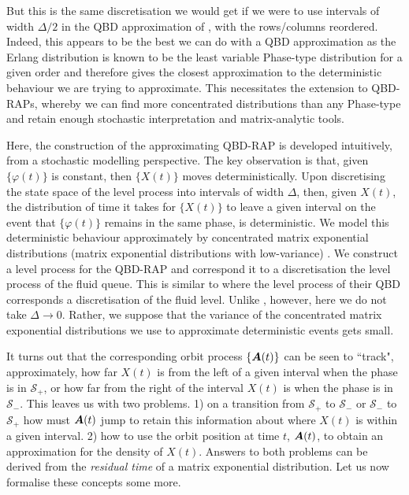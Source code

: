 But this is the same discretisation we would get if we were to use intervals of width \(\Delta/2\) in the QBD approximation of \cite{bo2013}, with the rows/columns reordered. Indeed, this appears to be the best we can do with a QBD approximation as the Erlang distribution is known to be the least variable Phase-type distribution for a given order \citep{as1987} and therefore gives the closest approximation to the deterministic behaviour we are trying to approximate. This necessitates the extension to QBD-RAPs, whereby we can find more concentrated distributions than any Phase-type and retain enough stochastic interpretation and matrix-analytic tools. 

Here, the construction of the approximating QBD-RAP is developed intuitively, from a stochastic modelling perspective. The key observation is that, given \(\{\varphi(t)\}\) is constant, then \(\{X(t)\}\) moves deterministically. Upon discretising the state space of the level process into intervals of width \(\Delta\), then, given \(X(t)\), the distribution of time it takes for \(\{X(t)\}\) to leave a given interval on the event that \(\{\varphi(t)\}\) remains in the same phase, is deterministic. We model this deterministic behaviour approximately by concentrated matrix exponential distributions (matrix exponential distributions with low-variance) \citep{ert2006,hstz2016,ert2006,hht2020,mt2021}. We construct a level process for the QBD-RAP and correspond it to a discretisation the level process of the fluid queue. This is similar to \cite{bo2013} where the level process of their QBD corresponds a discretisation of the fluid level. Unlike \cite{bo2013}, however, here we do not take \(\Delta \to 0\). Rather, we suppose that the variance of the concentrated matrix exponential distributions we use to approximate deterministic events gets small. %

It turns out that the corresponding orbit process \(\{\boldsymbol A(t)\}\) can be seen to ``track", approximately, how far \(X(t)\) is from the left of a given interval when the phase is in \(\mathcal S_+\), or how far from the right of the interval \(X(t)\) is when the phase is in \(\mathcal S_-\). This leaves us with two problems. 1) on a transition from \(\mathcal S_+\) to \(\mathcal S_-\) or \(\mathcal S_-\) to \(\mathcal S_+\) how must \(\boldsymbol A(t)\) jump to retain this information about where \(X(t)\) is within a given interval. 2) how to use the orbit position at time \(t\), \(\boldsymbol A(t)\), to obtain an approximation for the density of \(X(t)\). Answers to both problems can be derived from the \emph{residual time} of a matrix exponential distribution. Let us now formalise these concepts some more. 

